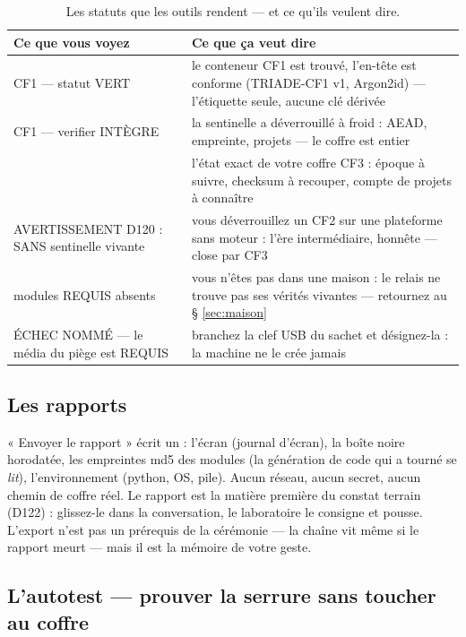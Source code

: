 \begin{table}[htbp]
\centering\small
\caption{Les statuts que les outils rendent — et ce qu'ils veulent dire.}
\label{tab:statuts}
\begin{tabularx}{\textwidth}{@{}l Y@{}}
\toprule
\textbf{Ce que vous voyez} & \textbf{Ce que ça veut dire} \\
\midrule
CF1 — statut VERT & le conteneur CF1 est trouvé, l'en-tête est conforme
(TRIADE-CF1 v1, Argon2id) — l'étiquette seule, aucune clé dérivée \\
CF1 — verifier INTÈGRE & la sentinelle a déverrouillé à froid : AEAD, empreinte,
projets — le coffre est entier \\
 & l'état
exact de votre coffre CF3 : époque à suivre, checksum à recouper, compte de projets
à connaître \\
AVERTISSEMENT D120 : SANS sentinelle vivante & vous déverrouillez un CF2 sur une
plateforme sans moteur : l'ère intermédiaire, honnête — close par CF3 \\
modules REQUIS absents & vous n'êtes pas dans une maison : le relais ne trouve pas
ses vérités vivantes — retournez au § \ref{sec:maison} \\
ÉCHEC NOMMÉ — le média du piège est REQUIS & branchez la clef USB du sachet et
désignez-la : la machine ne le crée jamais \\
\bottomrule
\end{tabularx}
\end{table}

\subsection{Les rapports}\label{sec:rapports}

« Envoyer le rapport » écrit un  : l'écran (journal d'écran), la boîte
noire horodatée, les empreintes md5 des modules (la génération de code qui a tourné se
\emph{lit}), l'environnement (python, OS, pile). Aucun réseau, aucun secret, aucun
chemin de coffre réel. Le rapport est la matière première du constat terrain (D122) :
glissez-le dans la conversation, le laboratoire le consigne et pousse. L'export n'est
pas un prérequis de la cérémonie — la chaîne vit même si le rapport meurt — mais il
est la mémoire de votre geste.

\subsection{L'autotest — prouver la serrure sans toucher au coffre}\label{sec:autotest}

